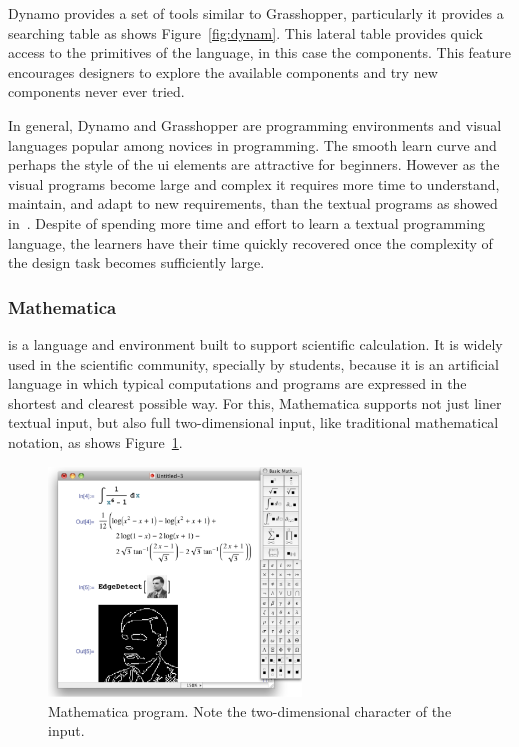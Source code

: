 Dynamo provides a set of tools similar to Grasshopper, particularly it provides a searching table as shows Figure~\ref{fig:dynam}. This lateral table provides quick access to the primitives of the language, in this case the components. This feature encourages designers to explore the available components and try new components never ever tried.  

In general, Dynamo and Grasshopper are programming environments and visual languages popular among novices in programming. The smooth learn curve and perhaps the style of the \ac{ui} elements are attractive for beginners. However as the visual programs become large and complex it requires more time to understand, maintain, and adapt to new requirements, than the textual programs as showed in~\cite{leitao2011programming}. Despite of spending more time and effort to learn a textual programming language, the learners have their time quickly recovered once the complexity of the design task becomes sufficiently large.
\subsubsection{Mathematica~\cite{wolfram1991mathematica}} is a language and environment built to support scientific calculation. It is widely used in the scientific community, specially by students, because it is an artificial language in which typical computations and programs are expressed in the shortest and clearest possible way. For this, Mathematica supports not just liner textual input, but also full two-dimensional input, like traditional mathematical notation, as shows Figure~\ref{fig:math}.

\begin{figure}
  \vspace{-20pt}
  \begin{center}
    \includegraphics[width=0.6\textwidth]{img/mathematica}
  \end{center}
  \vspace{-15pt}
 \caption{Mathematica program. Note the two-dimensional character of the input.}  
  \vspace{-20pt}
    \label{fig:math}
\end{figure}

